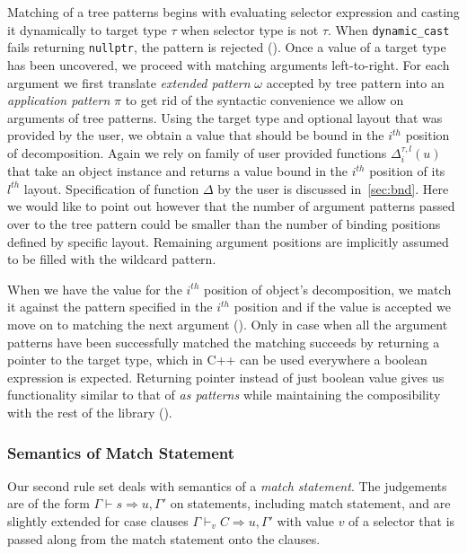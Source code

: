 \documentclass[preprint]{sigplanconf}
\makeatletter
\DeclareRobustCommand{\code}[1]{{\lstinline[breaklines=false,escapechar=@]{#1}}}
\newcommand{\evals}{\Rightarrow}
\makeatother
\begin{document}
Matching of a tree patterns begins with evaluating selector expression and 
casting it dynamically to target type $\tau$ when selector type is not $\tau$. 
When \code{dynamic_cast} fails returning \code{nullptr}, the pattern is rejected 
(). Once a value of a target type has been uncovered, 
we proceed with matching arguments left-to-right. For each argument we first 
translate \emph{extended pattern} $\omega$ accepted by tree pattern into an 
\emph{application pattern} $\pi$ to get rid of the syntactic convenience we 
allow on arguments of tree patterns. Using the target type and optional layout 
that was provided by the user, we obtain a value that should be bound in the 
$i^{th}$ position of decomposition. Again we rely on family of user provided 
functions $\Delta_i^{\tau,l}(u)$ that take an object instance and returns a 
value bound in the $i^{th}$ position of its $l^{th}$ layout. Specification of 
function $\Delta$ by the user is discussed in~\textsection\ref{sec:bnd}. Here we 
would like to point out however that the number of argument patterns passed over 
to the tree pattern could be smaller than the number of binding positions defined 
by specific layout. Remaining argument positions are implicitly assumed to be 
filled with the wildcard pattern.

When we have the value for the $i^{th}$ position of object's decomposition, we 
match it against the pattern specified in the $i^{th}$ position and if the value 
is accepted we move on to matching the next argument (). 
Only in case when all the argument patterns have been successfully matched the 
matching succeeds by returning a pointer to the target type, which in C++ can be 
used everywhere a boolean expression is expected. Returning pointer instead of 
just boolean value gives us functionality similar to that of \emph{as 
patterns} while maintaining the composibility with the 
rest of the library ().

\subsubsection{Semantics of Match Statement}
\label{sec:semms}

Our second rule set deals with semantics of a \emph{match statement}. The 
judgements are of the form $\Gamma\vdash s \evals u,\Gamma'$ on statements, 
including match statement, and are slightly extended for case clauses 
$\Gamma\vdash_v C \evals u,\Gamma'$ with value $v$ of a selector that is passed 
along from the match statement onto the clauses.
\end{document}
